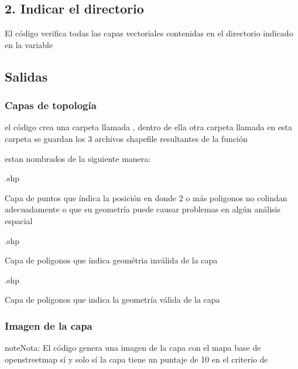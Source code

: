 \documentclass[letterpaper,10pt,spanish]{sphinxmanual}
\begin{document}
\noindent{}


\subsection{2. Indicar el directorio}
\label{\detokenize{verificacion:indicar-el-directorio}}
El código verifica todas las capas vectoriales contenidas en el directorio
indicado en la variable 

\begin{sphinxVerbatim}[commandchars=\\\{\}]
  
\end{sphinxVerbatim}


\subsection{Salidas}
\label{\detokenize{verificacion:salidas}}

\subsubsection{Capas de topología}
\label{\detokenize{verificacion:capas-de-topologia}}
el código crea una carpeta llamada , dentro de ella otra carpeta llamada  en esta
carpeta se guardan los 3 archivos shapefile  resultantes de la función 

estan nombrados de la siguiente manera:

.shp

Capa de puntos que índica la posición en donde 2 o más poligonos no colindan adecuadamente
o que su geometría puede causar problemas en algún análisis espacial

.shp

Capa de poligonos que índica geométria inválida de la capa

.shp

Capa de poligonos que indica la geometría válida de la capa


\subsubsection{Imagen de la capa}
\label{\detokenize{verificacion:imagen-de-la-capa}}
\begin{sphinxadmonition}{note}{Nota:}
El código genera una imagen de la capa con el mapa base de openstreetmap
sí y solo sí la capa tiene un puntaje de 10 en el criterio de 
\end{sphinxadmonition}
\end{document}
